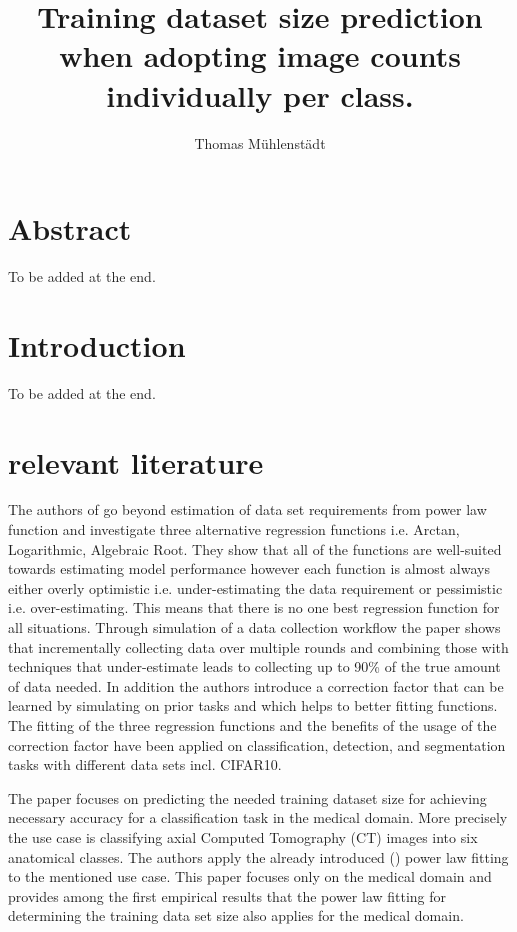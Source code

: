 \documentclass{article} %
\title{Training dataset size prediction when adopting image counts individually per class.}
\author{Thomas Mühlenstädt}
\begin{document}
\maketitle

\section*{Abstract}

To be added at the end.

\section{Introduction}

To be added at the end.


\section{relevant literature}
The authors of \cite{mahmood2022data} go beyond estimation of data set requirements from power law function and investigate three alternative regression functions i.e. Arctan, Logarithmic, Algebraic Root. They show that all of the functions are well-suited towards estimating model performance however each function is almost always either overly optimistic i.e. under-estimating the data requirement or pessimistic i.e. over-estimating. This means that there is no one best regression function for all situations. Through simulation of a data collection workflow the paper shows that incrementally collecting data over multiple rounds and combining those with techniques that under-estimate leads to collecting up to 90\% of the true amount of data needed. In addition the authors introduce a correction factor that can be learned by simulating on prior tasks and which helps to better fitting functions. The fitting of the three regression functions and the benefits of the usage of the correction factor have been applied on classification, detection, and segmentation tasks with different data sets incl. CIFAR10.

The paper \cite{cho2016data} focuses on predicting the needed training dataset size for achieving necessary accuracy for a classification task in the medical domain. More precisely the use case is classifying axial Computed Tomography (CT) images into six anatomical classes. The authors apply the already introduced (\cite{Figueroa2012PredictingSampleSizeForClass}) power law fitting to the mentioned use case. This paper focuses only on the medical domain and provides among the first empirical results that the power law fitting for determining the training data set size also applies for the medical domain.
\end{document}
